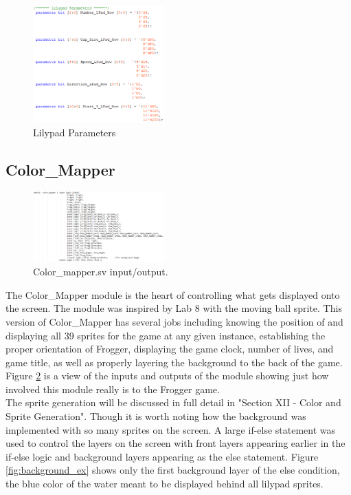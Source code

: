 \documentclass[journal, twocolumn, final,11pt,letterpaper]{IEEEtran}
\begin{document}
	\begin{figure}[H]
		\centering
		\includegraphics[width=0.45\textwidth]{lilypad_parameters.png}
		\caption{Lilypad Parameters}
		\label{fig:lilypad-parameters]}
	\end{figure}
	
	\subsection{Color\_Mapper}

	\begin{figure}[H]
		\centering
		\includegraphics[width=0.45\textwidth]{color_mapper_io.png}
		\caption{Color\_mapper.sv input/output.}
		\label{fig:color_mapper_io}
	\end{figure}
	
	The Color\_Mapper module is the heart of controlling what gets displayed onto the screen.  The module was inspired by Lab 8 with the moving ball sprite.  This version of Color\_Mapper has several jobs including knowing the position of and displaying all 39 sprites for the game at any given instance, establishing the proper orientation of Frogger, displaying the game clock, number of lives, and game title, as well as properly layering the background to the back of the game.  Figure \ref{fig:color_mapper_io} is a view of the inputs and outputs of the module showing just how involved this module really is to the Frogger game.  	\\
	
	The sprite generation will be discussed in full detail in "Section XII - Color and Sprite Generation".  Though it is worth noting how the background was implemented with so many sprites on the screen.  A large if-else statement was used to control the layers on the screen with front layers appearing earlier in the if-else logic and background layers appearing as the else statement.  Figure \ref{fig:background_ex} shows only the first background layer of the else condition, the blue color of the water meant to be displayed behind all lilypad sprites.     
	
\end{document}
